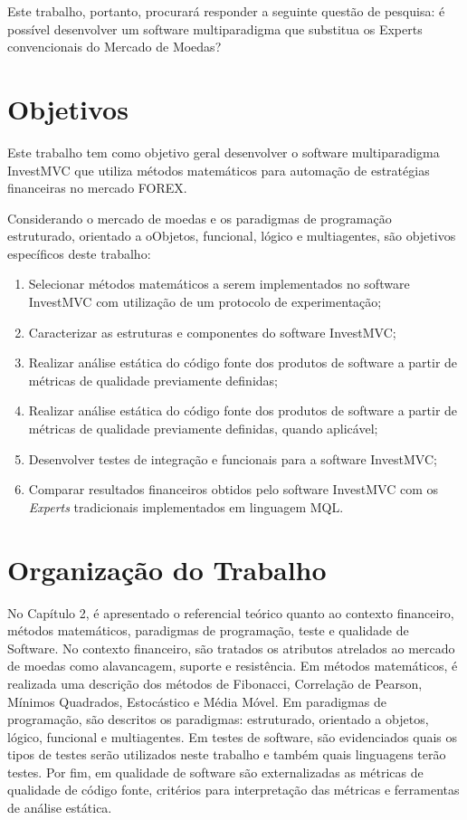 Este trabalho, portanto, procurará responder a seguinte questão de pesquisa: é possível desenvolver um software multiparadigma que substitua os Experts convencionais do Mercado de Moedas?

\section{Objetivos}
Este trabalho tem como objetivo geral desenvolver o software multiparadigma InvestMVC que utiliza métodos matemáticos para automação de estratégias financeiras no mercado FOREX.

Considerando o mercado de moedas e os paradigmas de programação estruturado, orientado a oObjetos, funcional, lógico e multiagentes, são objetivos específicos deste trabalho:

\begin{enumerate}
\item  Selecionar métodos matemáticos a serem implementados no software InvestMVC com utilização de um protocolo de experimentação;

\item Caracterizar as estruturas e componentes do software InvestMVC;

\item Realizar análise estática do código fonte dos produtos de software a partir de métricas de qualidade previamente definidas;

\item  Realizar análise estática do código fonte dos produtos de software a partir de métricas de qualidade previamente definidas, quando aplicável;

\item Desenvolver testes de integração e funcionais para a software InvestMVC;

\item Comparar resultados financeiros obtidos pelo software InvestMVC com os \textit{Experts} tradicionais implementados em linguagem MQL.
\end{enumerate}

\section{Organização do Trabalho}
No Capítulo 2, é apresentado o referencial teórico quanto ao contexto financeiro, métodos matemáticos, paradigmas de programação, teste e qualidade de Software. No contexto financeiro, são tratados os atributos atrelados ao mercado de moedas como alavancagem, suporte e resistência. Em métodos matemáticos, é realizada uma descrição dos métodos de Fibonacci, Correlação de Pearson, Mínimos Quadrados, Estocástico e Média Móvel. Em paradigmas de programação, são descritos os paradigmas: estruturado, orientado a objetos, lógico, funcional e multiagentes. Em testes de software, são evidenciados quais os tipos de testes serão utilizados neste trabalho e também quais linguagens terão testes. Por fim, em qualidade de software são externalizadas as métricas de qualidade de código fonte, critérios para interpretação das métricas e ferramentas de análise estática.

